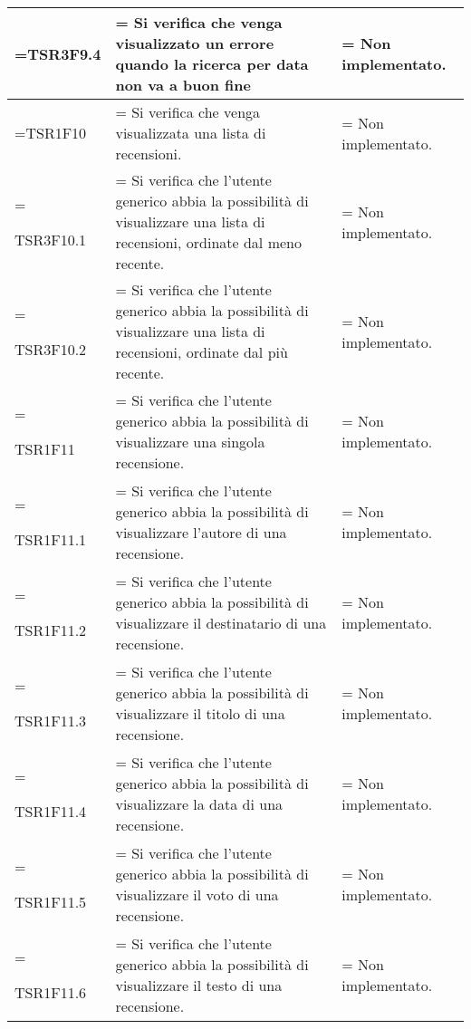 \begin{xltabular}{\textwidth} {
        >{\hsize\linewidth=\hsize}X
        >{\hsize\linewidth=\hsize}X
        >{\hsize\linewidth=\hsize}X
    }
    TSR3F9.4&
    Si verifica che venga visualizzato un errore quando la ricerca per data non va a buon fine &
    Non implementato.
    \\ \hline

    TSR1F10&
    Si verifica che venga visualizzata una lista di recensioni. &
    Non implementato.
    \\ \hline
    

    TSR3F10.1 &
    Si verifica che l'utente generico abbia la possibilità di visualizzare una lista di recensioni,
    ordinate dal meno recente.  &
    Non implementato.
    \\ \hline

    TSR3F10.2 &
    Si verifica che l'utente generico abbia la possibilità di visualizzare una lista di recensioni,
    ordinate dal più recente.  &
    Non implementato.
    \\ \hline

    TSR1F11 &
    Si verifica che l'utente generico abbia la possibilità di visualizzare una singola recensione.  &
    Non implementato.
    \\ \hline
    
    TSR1F11.1 &
    Si verifica che l'utente generico abbia la possibilità di visualizzare l'autore di una recensione.  &
    Non implementato.
    \\ \hline
    
    TSR1F11.2 &
    Si verifica che l'utente generico abbia la possibilità di visualizzare il destinatario di una recensione.  &
    Non implementato.
    \\ \hline

    TSR1F11.3 &
    Si verifica che l'utente generico abbia la possibilità di visualizzare il titolo di una recensione.  &
    Non implementato.
    \\ \hline

    TSR1F11.4 &
    Si verifica che l'utente generico abbia la possibilità di visualizzare la data di una recensione.  &
    Non implementato.
    \\ \hline

    TSR1F11.5 &
    Si verifica che l'utente generico abbia la possibilità di visualizzare il voto di una recensione.  &
    Non implementato.
    \\ \hline

    TSR1F11.6 &
    Si verifica che l'utente generico abbia la possibilità di visualizzare il testo di una recensione.  &
    Non implementato.
    \\ \hline


\end{xltabular}
